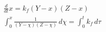 \begin{align}
  \frac{d}{d t} x = k_{f} \left(Y - x\right) \left(Z - x\right) \\
  \int_{0}^{x} \frac{1}{\left(Y - \chi\right) \left(Z - \chi\right)}\, d\chi = \int_{0}^{t} k_{f}\, d\tau
\end{align}
